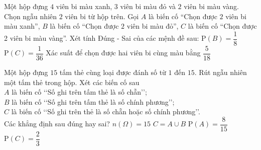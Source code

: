 \begin{ex}%
 Một hộp đựng $4$ viên bi màu xanh, $3$ viên bi màu đỏ và $2$ viên bi màu vàng. Chọn ngẫu nhiên $2$ viên bi từ hộp trên. Gọi $A$ là biến cố ``Chọn được $2$ viên bi màu xanh'', $B$ là biến cố ``Chọn được $2$ viên bi màu đỏ'', $C$ là biến cố ``Chọn được 2 viên bi  màu vàng''. Xét tính Đúng - Sai của các mệnh đề sau:
  {$\mathrm{P}(B)=\dfrac{1}{8}$} 
  {\True $\mathrm{P}(C)=\dfrac{1}{36}$} 
  {\True Xác suất  để chọn được hai viên bi cùng màu bằng $\dfrac{5}{18}$}
\end{ex}

\begin{ex}%
 Một hộp đựng $15$ tấm thẻ cùng loại được đánh số từ $1$ đến $15$. Rút ngẫu nhiên một tấm  thẻ trong hộp. Xét các biến cố sau\\
 \indent  \indent $A$ là biến cố \lq\lq Số ghi trên tấm thẻ là số chẵn\rq\rq; \\
 \indent \indent $B$ là biến cố \lq\lq Số ghi trên tấm thẻ là số chính phương\rq\rq;  \\
 \indent \indent $C$ là biến cố \lq\lq Số ghi trên thẻ là số chẵn hoặc số chính  phương\rq\rq.\\
 Các khẳng định sau  đúng hay sai?
  \choiceTF
   {\True $n \left(\Omega\right)=15$}
   {\True $C=A\cup B$}
   {$\mathrm{P}\left(A\right) = \dfrac{8}{15}$}
  {\True  $\mathrm{P}\left(C\right) = \dfrac{2}{3}$}
\end{ex}

